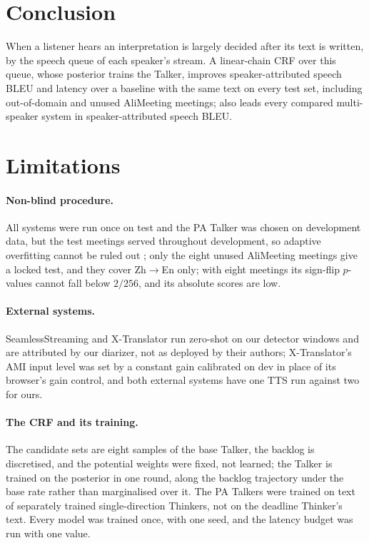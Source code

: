 \section{Conclusion}
\label{sec:conclusion}

When a listener hears an interpretation is largely decided after its text is written, by the speech queue of each
speaker's stream. A linear-chain CRF over this queue, whose posterior trains the Talker, improves speaker-attributed
speech BLEU and latency over a baseline with the same text on every test set, including out-of-domain and unused
AliMeeting meetings; \sys{} also leads every compared multi-speaker system in speaker-attributed speech BLEU.

\section*{Limitations}

\paragraph{Non-blind procedure.}\label{sec:res-hygiene} All systems were run once on test and the PA Talker was chosen
on development data, but the test meetings served throughout development, so adaptive overfitting cannot be ruled out%
\ifAliEval{}; only the eight unused AliMeeting meetings give a locked test, and they cover Zh$\rightarrow$En only;
with eight meetings its sign-flip $p$-values cannot fall below $2/256$, and its absolute scores are low\fi.

\paragraph{External systems.} SeamlessStreaming and X-Translator run zero-shot on our detector windows and are
attributed by our diarizer, not as deployed by their authors; X-Translator's AMI input level was set by a constant gain
calibrated on dev in place of its browser's gain control, and both external systems have one TTS run against two for
ours.

\paragraph{The CRF and its training.} The candidate sets are eight samples of the base Talker, the backlog is
discretised, and the potential weights were fixed, not learned; the Talker is trained on the posterior in one round, along the
backlog trajectory under the base rate rather than marginalised over it. The PA Talkers were trained on text of separately
trained single-direction Thinkers, not on the deadline Thinker's text. Every model was trained once, with one
seed, and the latency budget was run with one value.

